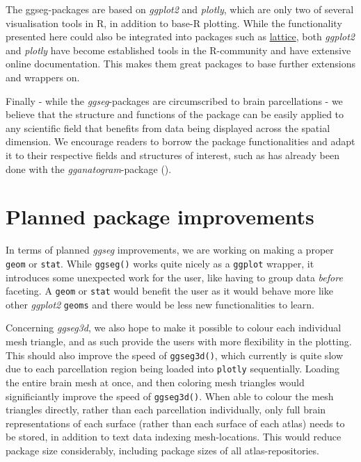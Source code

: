 \documentclass[fleqn,10pt]{wlpeerj} %
\begin{document}
The ggseg-packages are based on \emph{ggplot2} and \emph{plotly}, which are only two of several visualisation tools in R, in addition to base-R plotting.
While the functionality presented here could also be integrated into packages such as \href{https://www.rdocumentation.org/packages/lattice/versions/0.20-40}{lattice}, both \emph{ggplot2} and \emph{plotly} have become established tools in the R-community and have extensive online documentation.
This makes them great packages to base further extensions and wrappers on.

Finally - while the \emph{ggseg}-packages are circumscribed to brain parcellations - we believe that the structure and functions of the package can be easily applied to any scientific field that benefits from data being displayed across the spatial dimension.
We encourage readers to borrow the package functionalities and adapt it to their respective fields and structures of interest, such as has already been done with the \emph{gganatogram}-package (\citet{gganatogram}).

\hypertarget{planned-package-improvements}{%
\section{Planned package improvements}\label{planned-package-improvements}}

In terms of planned \emph{ggseg} improvements, we are working on making a proper \texttt{geom} or \texttt{stat}.
While \texttt{ggseg()} works quite nicely as a \texttt{ggplot} wrapper, it introduces some unexpected work for the user, like having to group data \emph{before} faceting.
A \texttt{geom} or \texttt{stat} would benefit the user as it would behave more like other \emph{ggplot2} \texttt{geoms} and there would be less new functionalities to learn.

Concerning \emph{ggseg3d}, we also hope to make it possible to colour each individual mesh triangle, and as such provide the users with more flexibility in the plotting.
This should also improve the speed of \texttt{ggseg3d()}, which currently is quite slow due to each parcellation region being loaded into \texttt{plotly} sequentially.
Loading the entire brain mesh at once, and then coloring mesh triangles would significiantly improve the speed of \texttt{ggseg3d()}.
When able to colour the mesh triangles directly, rather than each parcellation individually, only full brain representations of each surface (rather than each surface of each atlas) needs to be stored, in addition to text data indexing mesh-locations.
This would reduce package size considerably, including package sizes of all atlas-repositories.
\end{document}
